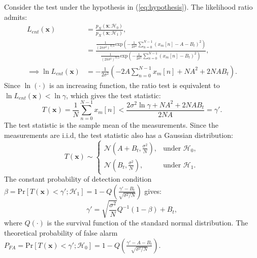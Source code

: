 \documentclass[11pt]{article}
\newcommand{\bx}{\mathbf{x}}
\newcommand{\cH}{\mathcal{H}}
\newcommand{\cN}{\mathcal{N}}
\newcommand{\Prob}{\mathrm{Pr}}
\begin{document}
Consider the test under the hypothesis in (\ref{eq:hypothesis}). The likelihood ratio admits:
\begin{equation}
\begin{split}
	L_{ent}(\bx) &= \frac{p_{X}(\bx; \cH_{0})}{p_{X}(\bx; \cH_{1})}, \\
&= \frac{\frac{1}{(2\pi\sigma^{2})^{N/2}} \mathrm{exp}\left(-\frac{1}{2\sigma^{2}} \sum_{n=0}^{N-1} (x_{m}[n] - A - B_{t})^{2} \right)}{\frac{1}{(2\pi\sigma^{2})^{N/2}} \mathrm{exp}\left(-\frac{1}{2\sigma^{2}} \sum_{n=0}^{N-1} (x_{m}[n] - B_{t})^{2} \right)}, \\
\implies \ln L_{ent}(\bx) &= -\frac{1}{2\sigma^{2}} \left( -2A \sum_{n=0}^{N-1}x_{m}[n] + NA^{2} + 2NAB_{t} \right).
\end{split}
\label{eq:CDRlnTest}
\end{equation}
Since $\ln(\cdot)$ is an increasing function, the ratio test is equivalent to $\ln L_{ent}(\bx) < \ln\gamma$, which gives the test statistic:
\begin{equation}
	T(\bx) = \frac{1}{N} \sum_{n=0}^{N-1}x_{m}[n] < \frac{2\sigma^{2}\ln\gamma + NA^{2} + 2NAB_{t}}{2NA} = \gamma'.
\label{eq:CDRtestStat}
\end{equation}
The test statistic is the sample mean of the measurements. Since the measurements are i.i.d, the test statistic also has a Gaussian distribution:
\begin{equation}
	T(\bx) \sim \begin{cases}
	\cN(A+B_{t}, \frac{\sigma^{2}}{N}), & \text{under }\cH_{0}, \\
	\cN(B_{t}, \frac{\sigma^{2}}{N}), & \text{under }\cH_{1}.
	\end{cases}
\label{eq:CDRstatDist}
\end{equation}
The constant probability of detection condition $\displaystyle \beta = \Prob[T(\bx) < \gamma';\cH_{1}] = 1-Q\left( \frac{\gamma'-B_{t}}{\sqrt{\sigma^{2}/N}} \right)$ gives:
\begin{equation}
	\gamma' = \sqrt{\frac{\sigma^{2}}{N}} Q^{-1}(1-\beta) + B_{t},
\label{eq:CDRthreshold}
\end{equation}
where $Q(\cdot)$ is the survival function of the standard normal distribution. The theoretical probability of false alarm $\displaystyle P_{FA} = \Prob[T(\bx) < \gamma';\cH_{0}] = 1-Q\left( \frac{\gamma'-A-B_{t}}{\sqrt{\sigma^{2}/N}} \right)$.

\end{document}
